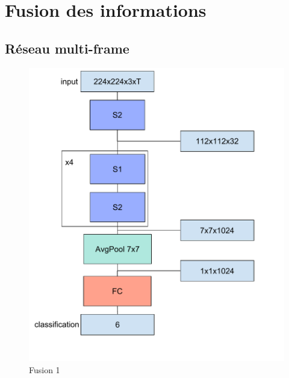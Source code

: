 \section{Fusion des informations}

\subsection{Réseau multi-frame}
\label{sec:multiframeSchemas}


\begin{figure}%
\includegraphics[width=\columnwidth]{figures/Reseau1Fusion1.pdf}%
\caption{Fusion 1}%
\label{fig:fusion1}%
\end{figure}


